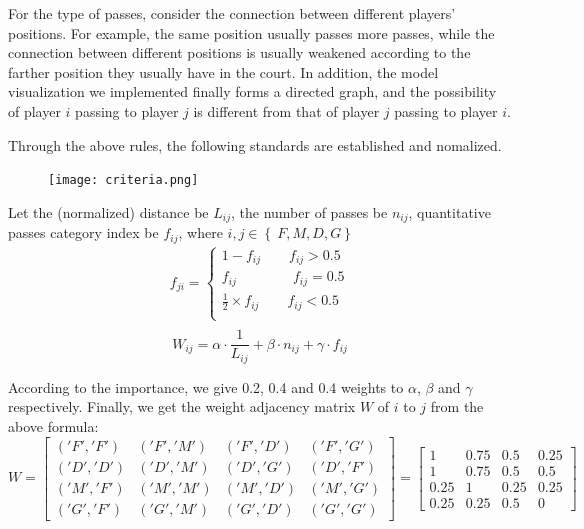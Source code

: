 \documentclass{mcmthesis}
\begin{document}
For the type of passes, consider the connection between different players’ positions. For example, the same position usually passes more passes, while the connection between different positions is usually weakened according to the farther position they usually have in the court. In addition, the model visualization we implemented finally forms a directed graph, and the possibility of player $i$ passing to player $j$ is different from that of player $j$ passing to player $i$.


Through the above rules, the following standards are established and nomalized.

\begin{figure}[h]
\small
\centering
\texttt{[image: criteria.png]}
\end{figure}


Let the (normalized) distance be $L_{ij}$, the number of passes be $n_{ij}$, quantitative passes category index be $f_{ij}$, where $i,j\in \left\{\ F,M,D,G \right\}$
\begin{eqnarray}
f_{ji}=\left\{\begin{array}{lr}
    1- f_{ij}       \qquad   f_{ij}>0.5\\
    f_{ij}          \qquad \qquad  f_{ij}=0.5\\
\frac{1}{2}\times f_{ij}   \qquad   f_{ij}<0.5\\
\end{array}
\right.\\
\end{eqnarray}
\begin{equation}
W_{ij}=\alpha\cdot \frac{1}{ L_{ij}}+\beta\cdot n_{ij}+\gamma\cdot f_{ij}
\end{equation}

According to the importance, we give 0.2, 0.4 and 0.4 weights to $\alpha$, $\beta$ and $\gamma$ respectively. Finally, we get the weight adjacency matrix $W$ of $i$ to $j$ from the above formula:
\begin{equation}
W=
\left[ \begin{array}{cccc}
('F','F') & ('F','M') & ('F','D') & ('F','G')\\
('D','D') & ('D','M') & ('D','G') & ('D','F')\\
('M','F') & ('M','M') & ('M','D') & ('M','G')\\
('G','F') & ('G','M') & ('G','D') & ('G','G')
\end{array}\right]
=\left[ \begin{array}{cccc}
1 & 0.75 & 0.5 & 0.25\\
1 & 0.75 & 0.5 & 0.5\\
0.25 & 1 & 0.25 & 0.25\\
0.25 & 0.25 & 0.5 & 0
\end{array}\right]
\end{equation}
\end{document}
